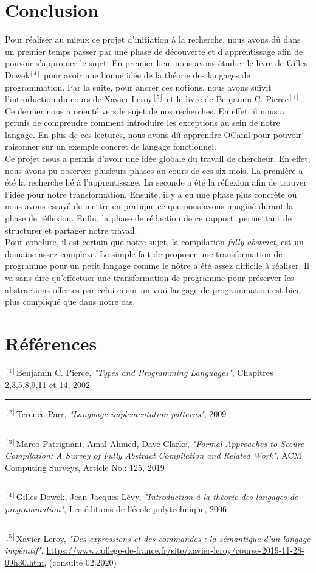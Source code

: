 \documentclass[11pt, a4paper, notitlepage]{article}
\newcommand\sep{\vspace*{3mm} \hrule \vspace*{3mm}}
\newcommand\tab{{\hspace*{12.5mm}}}
\begin{document}
\section{Conclusion}
\tab Pour réaliser au mieux ce projet d'initiation à la recherche, nous avons dû dans un premier temps passer par une phase de découverte et d'apprentissage afin de pouvoir s'appropier le sujet. En premier lieu, nous avons étudier le livre de Gilles Dowek$^{[4]}$ pour avoir une bonne idée de la théorie des langages de programmation. Par la suite, pour ancrer ces notions, nous avons suivit l'introduction du cours de Xavier Leroy$^{[5]}$ et le livre de Benjamin C. Pierce$^{[1]}$. Ce dernier nous a orienté vers le sujet de nos recherches. En effet, il nous a permis de comprendre comment introduire les exceptions au sein de notre langage. En plus de ces lectures, nous avons dû apprendre OCaml pour pouvoir raisonner sur un exemple concret de langage fonctionnel.\\
\tab Ce projet nous a permis d'avoir une idée globale du travail de chercheur. En effet, nous avons pu observer plusieurs phases au cours de ces six mois. La première a été la recherche lié à l'apprentissage. La seconde a été la réflexion afin de trouver l'idée pour notre transformation. Ensuite, il y a eu une phase plus concrète où nous avons essayé de mettre en pratique ce que nous avons imaginé durant la phase de réflexion. Enfin, la phase de rédaction de ce rapport, permettant de structurer et partager notre travail.\\
\tab Pour conclure, il est certain que notre sujet, la compilation \textit{fully abstract}, est un domaine assez complexe. Le simple fait de proposer une transformation de programme pour un petit langage comme le nôtre a été assez difficile à réaliser. Il va sans dire qu'effectuer une transformation de programme pour préserver les abstractions offertes par celui-ci sur un vrai langage de programmation est bien plus compliqué que dans notre cas.

\newpage
\section*{Références}
$^{[1]}$Benjamin C. Pierce, \textit{"Types and Programming Languages"}, Chapitres 2,3,5,8,9,11 et 14, 2002
\sep
$^{[2]}$Terence Parr, \textit{"Language implementation patterns"}, 2009
\sep
$^{[3]}$Marco Patrignani, Amal Ahmed, Dave Clarke, \textit{"Formal Approaches to Secure Compilation: A Survey of Fully Abstract Compilation and Related Work"}, ACM Computing Surveys, Article No.: 125, 2019
\sep
$^{[4]}$Gilles Dowek, Jean-Jacques Lévy, \textit{"Introduction à la théorie des langages de programmation"}, Les éditions de l'école polytechnique, 2006
\sep
$^{[5]}$Xavier Leroy, \textit{"Des expressions et des commandes : la sémantique d'un langage impératif"}, \url{https://www.college-de-france.fr/site/xavier-leroy/course-2019-11-28-09h30.htm}, (consulté 02.2020)
\end{document}
